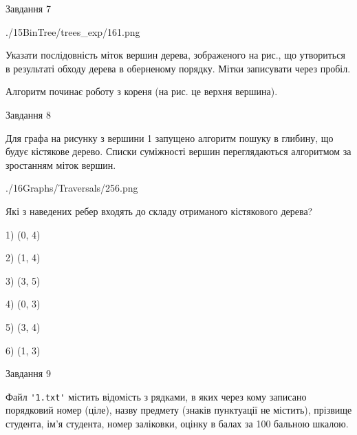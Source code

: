 \documentclass[12pt, ukrainian]{article}
\def\code#1{\Verb!#1!}
\begin{document}
{\newpage
\begin{minipage}[t]{9.7cm}
               
{\begin{center}Завдання {7}\end{center}}
\vspace{-6mm}

\begin{center}
	{./15BinTree/trees_exp/161.png}
\end{center}
Указати послідовність міток вершин дерева, зображеного на рис., що утвориться в результаті обходу дерева в оберненому порядку. Мітки записувати через пробіл.\par Алгоритм починає роботу з кореня (на рис. це верхня вершина).\par

\end{minipage}
\vline \hspace{8mm}
\begin{minipage}[t]{8.0cm}
               
{\begin{center}Завдання {8}\end{center}}
\vspace{-6mm}
Для графа на рисунку з вершини 1 запущено алгоритм пошуку в глибину, що будує кістякове дерево. Списки суміжності вершин переглядаються алгоритмом за зростанням міток вершин.\par
\begin{center}
	{./16Graphs/Traversals/256.png}
\end{center}
\par Які з наведених ребер входять до складу отриманого кістякового дерева?\par
1) (0, 4)\par
2) (1, 4)\par
3) (3, 5)\par
4) (0, 3)\par
5) (3, 4)\par
6) (1, 3)\par
{\vskip 15pt} \par

\end{minipage}

               
{\begin{center}Завдання {9}\end{center}}
\vspace{-6mm}
Файл \code{'1.txt'} містить відомість з рядками, в яких через кому записано поряд\-ковий номер (ціле), назву предмету (знаків пунктуації не містить), прізвище студента, ім'я студента, номер заліковки, оцінку в балах за 100 бальною шкалою.

}
\end{document}
